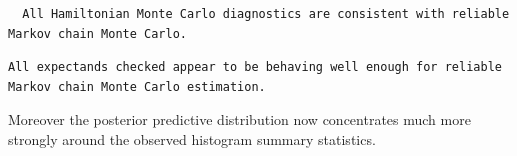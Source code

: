 \documentclass[
  letterpaper,
  DIV=11,
  numbers=noendperiod]{scrartcl}
\newenvironment{Shaded}{\begin{snugshade}}{\end{snugshade}}
\newcommand{\FunctionTok}[1]{\textcolor[rgb]{0.28,0.35,0.67}{#1}}
\newcommand{\NormalTok}[1]{\textcolor[rgb]{0.00,0.23,0.31}{#1}}
\newcommand{\OtherTok}[1]{\textcolor[rgb]{0.00,0.23,0.31}{#1}}
\newcommand{\SpecialCharTok}[1]{\textcolor[rgb]{0.37,0.37,0.37}{#1}}
\newcommand{\StringTok}[1]{\textcolor[rgb]{0.13,0.47,0.30}{#1}}
\begin{document}
\begin{verbatim}
  All Hamiltonian Monte Carlo diagnostics are consistent with reliable
Markov chain Monte Carlo.
\end{verbatim}

\begin{Shaded}
\end{Shaded}

\begin{verbatim}
All expectands checked appear to be behaving well enough for reliable
Markov chain Monte Carlo estimation.
\end{verbatim}

Moreover the posterior predictive distribution now concentrates much
more strongly around the observed histogram summary statistics.
\end{document}
